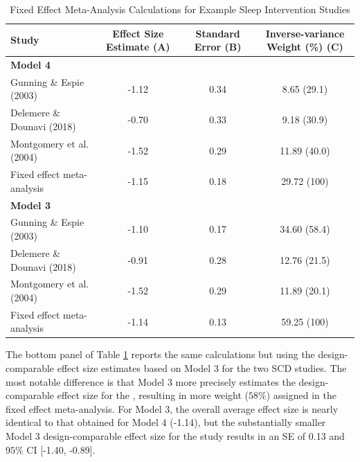 \documentclass[
]{book}
\begin{document}
\begin{table}

\caption{\label{tab:ES-est-chapter4}Fixed Effect Meta-Analysis Calculations for 
             Example Sleep Intervention Studies}
\centering
\begin{tabular}[t]{l|c|c|c}
\hline
Study & Effect Size Estimate (A) & Standard Error (B) & Inverse-variance Weight (\%) (C)\\
\hline
\multicolumn{4}{l}{\textbf{Model 4}}\\
\hline
\hspace{1em}Gunning \& Espie (2003) & -1.12 & 0.34 & 8.65 (29.1)\\
\hline
\hspace{1em}Delemere \& Dounavi (2018) & -0.70 & 0.33 & 9.18 (30.9)\\
\hline
\hspace{1em}Montgomery et al. (2004) & -1.52 & 0.29 & 11.89 (40.0)\\
\hline
\hspace{1em}Fixed effect meta-analysis & -1.15 & 0.18 & 29.72 (100)\\
\hline
\multicolumn{4}{l}{\textbf{Model 3}}\\
\hline
\hspace{1em}Gunning \& Espie (2003) & -1.10 & 0.17 & 34.60 (58.4)\\
\hline
\hspace{1em}Delemere \& Dounavi (2018) & -0.91 & 0.28 & 12.76 (21.5)\\
\hline
\hspace{1em}Montgomery et al. (2004) & -1.52 & 0.29 & 11.89 (20.1)\\
\hline
\hspace{1em}Fixed effect meta-analysis & -1.14 & 0.13 & 59.25 (100)\\
\hline
\end{tabular}
\end{table}

The bottom panel of Table \ref{tab:ES-est-chapter4} reports the same calculations but using the design-comparable effect size estimates based on Model 3 for the two SCD studies. The most notable difference is that Model 3 more precisely estimates the design-comparable effect size for the \citet{gunning2003Psychological}, resulting in more weight (\(58\%\)) assigned in the fixed effect meta-analysis. For Model 3, the overall average effect size is nearly identical to that obtained for Model 4 (-1.14), but the substantially smaller Model 3 design-comparable effect size for the \citet{gunning2003Psychological} study results in an SE of 0.13 and \(95\%\) CI {[}-1.40, -0.89{]}.
\end{document}
